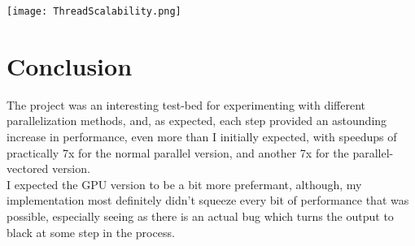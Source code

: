 \documentclass[sigconf]{acmart}
\begin{document}
\begin{center}
\texttt{[image: ThreadScalability.png]}
\end{center}

\newpage

\section{Conclusion}

The project was an interesting test-bed for experimenting with different parallelization methods, and, as expected, each step provided an astounding increase in performance, even more than I initially expected, with speedups of practically 7x for the normal parallel version, and another 7x for the parallel-vectored version.\\
I expected the GPU version to be a bit more prefermant, although, my implementation most definitely didn't squeeze every bit of performance that was possible, especially seeing as there is an actual bug which turns the output to black at some step in the process. 



\end{document}
